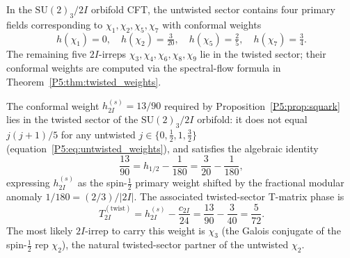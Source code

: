 \begin{corollary}
\label{P5:cor:sectors}
In the $\mathrm{SU}(2)_3/2I$ orbifold CFT, the untwisted sector
contains four primary fields corresponding to $\chi_1,\chi_2,\chi_5,\chi_7$
with conformal weights
\begin{equation}
  h(\chi_1)=0, \quad
  h(\chi_2)=\tfrac{3}{20}, \quad
  h(\chi_5)=\tfrac{2}{5}, \quad
  h(\chi_7)=\tfrac{3}{4}.
  \label{P5:eq:untwisted_weights}
\end{equation}
The remaining five $2I$-irreps $\chi_3,\chi_4,\chi_6,\chi_8,\chi_9$ lie
in the twisted sector; their conformal weights are computed via the
spectral-flow formula in Theorem~\ref{P5:thm:twisted_weights}.
\end{corollary}

\begin{proposition}
\label{P5:prop:2i_strange_sector}
The conformal weight $h_{2I}^{(s)}=13/90$ required by
Proposition~\ref{P5:prop:squark} lies in the twisted sector of the
$\mathrm{SU}(2)_3/2I$ orbifold: it does not equal $j(j{+}1)/5$ for any
untwisted $j\in\{0,\tfrac12,1,\tfrac32\}$ (equation~\eqref{P5:eq:untwisted_weights}),
and satisfies the algebraic identity
\begin{equation}
  \frac{13}{90} = h_{1/2} - \frac{1}{180} = \frac{3}{20} - \frac{1}{180},
  \label{P5:eq:h2I_anomaly}
\end{equation}
expressing $h_{2I}^{(s)}$ as the spin-$\tfrac12$ primary weight shifted
by the fractional modular anomaly $1/180=(2/3)/|2I|$. The associated
twisted-sector T-matrix phase is
\begin{equation}
  T_{2I}^{(\mathrm{twist})} = h_{2I}^{(s)} - \frac{c_{2I}}{24}
  = \frac{13}{90} - \frac{3}{40} = \frac{5}{72}.
  \label{P5:eq:T_twist_s}
\end{equation}
The most likely $2I$-irrep to carry this weight is $\chi_3$ (the Galois
conjugate of the spin-$\tfrac12$ rep $\chi_2$), the natural
twisted-sector partner of the untwisted $\chi_2$.
\end{proposition}

